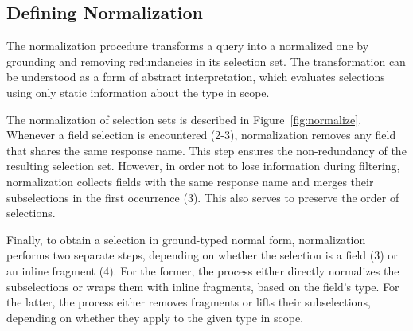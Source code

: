 \subsection{Defining Normalization}\label{subsec:normalization}


The normalization procedure transforms a query into a normalized one by grounding and removing redundancies in its selection set. The transformation can be understood as a form of abstract interpretation, which evaluates selections using only static information about the type in scope.

The normalization of selection sets is described in Figure~\ref{fig:normalize}. Whenever a field selection is encountered (2-3), normalization
removes any field that shares the same response name. This step ensures the non-redundancy of the resulting selection set. 
However, in order not to lose information during filtering, normalization collects fields with the same response name and merges their subselections in the first occurrence (3). This also serves to preserve the order of selections.

Finally, to obtain a selection in ground-typed normal form, normalization performs two separate steps, depending on whether the selection is a field (3) or an inline fragment (4). For the former, the process either directly normalizes the subselections or wraps them with inline fragments, based on the field's type.
For the latter, the process either removes fragments or lifts their subselections, depending on whether they apply to the given type in scope.


